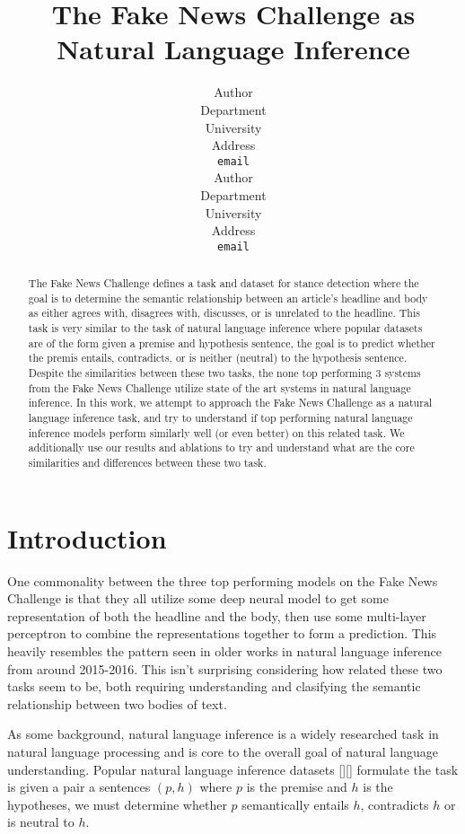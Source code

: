 \documentclass{article}
\title{The Fake News Challenge as Natural Language Inference}
\author{
  Author \\
  Department \\
  University \\
  Address \\
  \texttt{email} \\
  \And
  Author \\
  Department \\
  University \\
  Address \\
  \texttt{email} \\
}
\begin{document}

\maketitle

\begin{abstract}
  The Fake News Challenge defines a task and dataset for stance detection where the goal is to
  determine the semantic relationship between an article's headline and body as either
  agrees with, disagrees with, discusses, or is unrelated to the headline. This task is very similar
  to the task of natural language inference where popular datasets are of the form given a premise
  and hypothesis sentence, the goal is to predict whether the premis entails, contradicts,
  or is neither (neutral) to the hypothesis sentence. Despite the similarities between these two
  tasks, the none top performing 3 systems from the Fake News Challenge utilize state of
  the art systems in natural language inference. In this work, we attempt to approach the
  Fake News Challenge as a natural language inference task, and try to understand if top performing
  natural language inference models perform similarly well (or even better)
  on this related task. We additionally use our results and ablations to try and understand what are
  the core similarities and differences between these two task.
\end{abstract}

\section{Introduction}

One commonality between the three top performing models on the Fake News Challenge is that they
all utilize some deep neural model to get some representation of both the headline and the body,
then use some multi-layer perceptron to combine the representations together to form
a prediction. This heavily resembles the pattern seen in older works in natural language inference
from around 2015-2016. This isn't surprising considering how related these two tasks seem to be,
both requiring understanding and clasifying the semantic relationship between two bodies of text.

As some background, natural language inference is a widely researched task in natural language
processing and is core to the overall goal of natural language understanding.
Popular natural language inference datasets [][] formulate the task is given a pair a sentences
$(p, h)$ where $p$ is the premise and $h$ is the hypotheses, we must determine whether $p$
semantically entails $h$, contradicts $h$ or is neutral to $h$.
\end{document}
